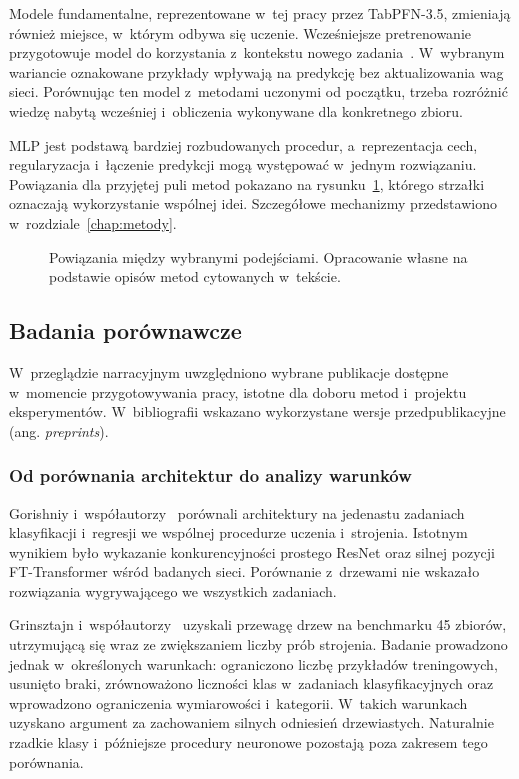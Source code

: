 Modele fundamentalne, reprezentowane w~tej pracy przez TabPFN-3.5, zmieniają również miejsce, w~którym odbywa się uczenie. Wcześniejsze pretrenowanie przygotowuje model do korzystania z~kontekstu nowego zadania~\cite{jaeger2026tabpfn35}. W~wybranym wariancie oznakowane przykłady wpływają na predykcję bez aktualizowania wag sieci. Porównując ten model z~metodami uczonymi od początku, trzeba rozróżnić wiedzę nabytą wcześniej i~obliczenia wykonywane dla konkretnego zbioru.

MLP jest podstawą bardziej rozbudowanych procedur, a~reprezentacja cech, regularyzacja i~łączenie predykcji mogą występować w~jednym rozwiązaniu. Powiązania dla przyjętej puli metod pokazano na rysunku~\ref{fig:mapa-podejsc}, którego strzałki oznaczają wykorzystanie wspólnej idei. Szczegółowe mechanizmy przedstawiono w~rozdziale~\ref{chap:metody}.

\begin{figure}[tbp]
\centering

\caption{Powiązania między wybranymi podejściami. Opracowanie własne na podstawie opisów metod cytowanych w~tekście.}
\label{fig:mapa-podejsc}
\end{figure}

\subsection{Badania porównawcze}
\label{sec:benchmarki}

W~przeglądzie narracyjnym uwzględniono wybrane publikacje dostępne w~momencie przygotowywania pracy, istotne dla doboru metod i~projektu eksperymentów. W~bibliografii wskazano wykorzystane wersje przedpublikacyjne (ang. \textit{preprints}).

\subsubsection{Od porównania architektur do analizy warunków}

Gorishniy i~współautorzy~\cite{gorishniy2021revisiting} porównali architektury na jedenastu zadaniach klasyfikacji i~regresji we wspólnej procedurze uczenia i~strojenia. Istotnym wynikiem było wykazanie konkurencyjności prostego ResNet oraz silnej pozycji FT-Transformer wśród badanych sieci. Porównanie z~drzewami nie wskazało rozwiązania wygrywającego we wszystkich zadaniach.

Grinsztajn i~współautorzy~\cite{grinsztajn2022trees} uzyskali przewagę drzew na benchmarku 45 zbiorów, utrzymującą się wraz ze zwiększaniem liczby prób strojenia. Badanie prowadzono jednak w~określonych warunkach: ograniczono liczbę przykładów treningowych, usunięto braki, zrównoważono liczności klas w~zadaniach klasyfikacyjnych oraz wprowadzono ograniczenia wymiarowości i~kategorii. W~takich warunkach uzyskano argument za zachowaniem silnych odniesień drzewiastych. Naturalnie rzadkie klasy i~późniejsze procedury neuronowe pozostają poza zakresem tego porównania.

